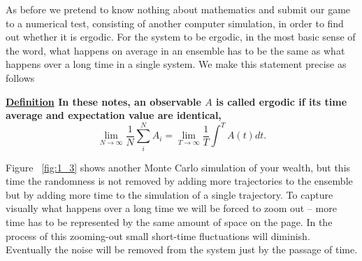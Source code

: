 \documentclass[a4paper]{article}
\newcommand{\Fref}[1]{Figure ~\ref{fig:#1}}
\newcommand{\be}{\begin{equation}}
\newcommand{\ee}{\end{equation}}
\newcommand{\definition}[1]{\vspace{.2cm} {\bf \underline{Definition} #1} \vspace{.2cm}}
\begin{document}
As before we pretend to know nothing about mathematics and submit our game to a numerical
test, consisting of another computer simulation, in order to find out whether it is ergodic. For the system to be ergodic, 
in the most basic sense of the word, what happens on average in an ensemble has to be the same as what happens
over a long time in a single system. We make this statement precise as follows

\definition{
In these notes, an observable $A$ is called ergodic if its time average and expectation value are identical,
\be
\lim_{N\to\infty} \frac{1}{N}\sum_i^N A_i = \lim_{T\to\infty}\frac{1}{T} \int^T A(t) dt.
\ee}


 \Fref{1_3} shows another Monte Carlo simulation of your wealth, but this time
the randomness is not removed by adding more trajectories to the ensemble but by adding more time to the simulation of 
a 
single trajectory.
To capture visually what happens over a long time we will be forced to zoom out -- more time has to be represented by 
the 
same 
amount
of space on the page. In the process of this zooming-out small short-time fluctuations will diminish. Eventually 
the noise will be removed from the system just by the passage of time.
\end{document}

